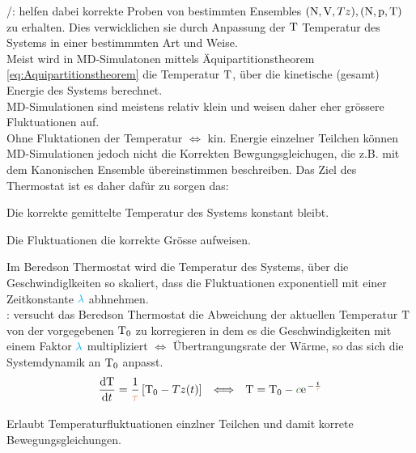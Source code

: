 \begin{sectionbox}\nospacing
  /: helfen dabei korrekte Proben von bestimmten Ensembles $(\mathrm{N},\mathrm{V},Tz),(\mathrm{N},\mathrm{p},\mathrm{T})$ zu erhalten.
  Dies verwicklichen sie durch Anpassung der $\mathrm{T}$ Temperatur des Systems in einer bestimmmten Art und Weise.\\
  Meist wird in MD-Simulatonen mittels Äquipartitionstheorem \cref{eq:Aquipartitionstheorem} die Temperatur $\mathrm{T}$, über die kinetische (gesamt) Energie des Systems
  berechnet.\\
  MD-Simulationen sind meistens relativ klein und weisen daher eher grössere Fluktuationen auf.\\
  Ohne Fluktationen der Temperatur $\Longleftrightarrow$ kin. Energie einzelner Teilchen können MD-Simulationen jedoch nicht die Korrekten Bewgungsgleichugen,
  die z.B. mit dem Kanonischen Ensemble übereinstimmen beschreiben.
  Das Ziel des Thermostat ist es daher dafür zu sorgen das:
  \begin{numberlist}
      \item Die korrekte gemittelte Temperatur des Systems konstant bleibt.
      \item Die Fluktuationen die korrekte Grösse aufweisen.
  \end{numberlist}
  Im Beredson Thermostat wird die Temperatur des Systems, über die Geschwindiglkeiten so skaliert, dass die Fluktuationen exponentiell mit einer Zeitkonstante
  $\lambdac$ abhnehmen.\\
  : versucht das Beredson Thermostat die Abweichung der aktuellen Temperatur $\mathrm{T}$ von der vorgegebenen $\mathrm{T}_0$ zu korregieren in dem es
  die Geschwindigkeiten mit einem Faktor $\lambdac$ multipliziert $\Longleftrightarrow$ Übertrangungsrate der Wärme, so das sich die Systemdynamik an $\mathrm{T}_0$ anpasst.
  \begin{align}
    \frac{\diff\Tz}{\diff t}=\frac{1}{\tauc}\left[\Tz_0-Tz(t)\right]&&\Longleftrightarrow&&\Tz=\Tz_0-\mcc\e^{-\frac{t}{\tauc}}\label{eq:berendsonFaktor}
  \end{align}
\end{sectionbox}
\begin{notebox}[Vorteil]
  Erlaubt Temperaturfluktuationen einzlner Teilchen und damit korrete Bewegungsgleichungen.
\end{notebox}
